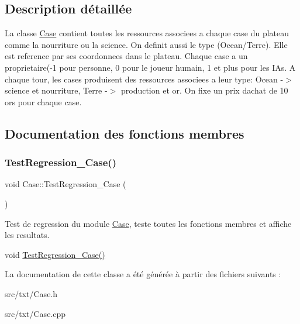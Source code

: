 \subsection{Description détaillée}
La classe \hyperlink{classCase}{Case} contient toutes les ressources associees a chaque case du plateau comme la nourriture ou la science. On definit aussi le type (Ocean/\+Terre). Elle est reference par ses coordonnees dans le plateau. Chaque case a un proprietaire(-\/1 pour personne, 0 pour le joueur humain, 1 et plus pour les I\+As. A chaque tour, les cases produisent des ressources associees a leur type\+: Ocean -\/$>$ science et nourriture, Terre -\/$>$ production et or. On fixe un prix d\textquotesingle{}achat de 10 ors pour chaque case. 

\subsection{Documentation des fonctions membres}
\mbox{\label{classCase_aca943dd6259fb44eeea2addd610a2f9d}} 
\subsubsection{\texorpdfstring{Test\+Regression\+\_\+\+Case()}{TestRegression\_Case()}}
{\footnotesize\ttfamily void Case\+::\+Test\+Regression\+\_\+\+Case (\begin{DoxyParamCaption}{ }\end{DoxyParamCaption})}



Test de regression du module \hyperlink{classCase}{Case}, teste toutes les fonctions membres et affiche les resultats. 

void \hyperlink{classCase_aca943dd6259fb44eeea2addd610a2f9d}{Test\+Regression\+\_\+\+Case()} 

La documentation de cette classe a été générée à partir des fichiers suivants \+:\begin{DoxyCompactItemize}
\item 
src/txt/Case.\+h\item 
src/txt/Case.\+cpp\end{DoxyCompactItemize}
